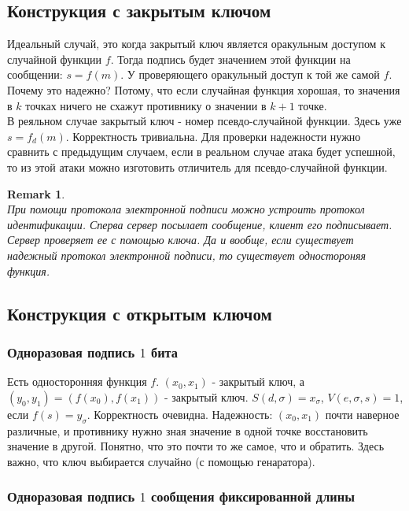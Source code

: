 \documentclass[a4paper]{article}
\theoremstyle{definition}
\theoremstyle{plain}
\newtheorem{remark}{Remark}
\begin{document}
\subsection{Конструкция с закрытым ключом}

Идеальный случай, это когда закрытый ключ является оракульным доступом к случайной функции $f$.
Тогда подпись будет значением этой функции на сообщении: $s = f(m)$. У проверяющего оракульный
доступ к той же самой $f$. Почему это надежно? Потому, что если случайная функция хорошая,
то значения в $k$ точках ничего не схажут противнику о значении в $k + 1$ точке.~\\

В реяльном случае закрытый ключ - номер псевдо-случайной функции.
Здесь уже $s = f_d(m)$. Корректность тривиальна. Для проверки надежности нужно
сравнить с предыдущим случаем, если в реальном случае атака будет успешной, то из этой атаки
можно изготовить отличитель для псевдо-случайной функции.

\begin{remark}~\\
	При помощи протокола электронной подписи можно устроить протокол идентификации.
	Сперва сервер посылает сообщение, клиент его подписывает. Сервер проверяет ее с помощью
	ключа. Да и вообще, если существует надежный протокол электронной подписи,
	то существует одностороняя функция.
\end{remark}

\subsection{Конструкция с открытым ключом}


\subsubsection{Одноразовая подпись $1$ бита}

Есть односторонняя функция $f$. $(x_0, x_1)$ - закрытый ключ,
а $(y_0, y_1) = (f(x_0), f(x_1))$ - закрытый ключ. $S(d, \sigma) = x_{\sigma}$,
$V(e, \sigma, s) = 1$, если $f(s) = y_{\sigma}$. Корректность очевидна. Надежность:
$(x_0, x_1)$ почти наверное различные, и противнику нужно зная значение в одной точке
восстановить значение в другой. Понятно, что это почти то же самое, что и обратить.
Здесь важно, что ключ выбирается случайно (с помощью генаратора).

\subsubsection{Одноразовая подпись $1$ сообщения фиксированной длины}
\end{document}
